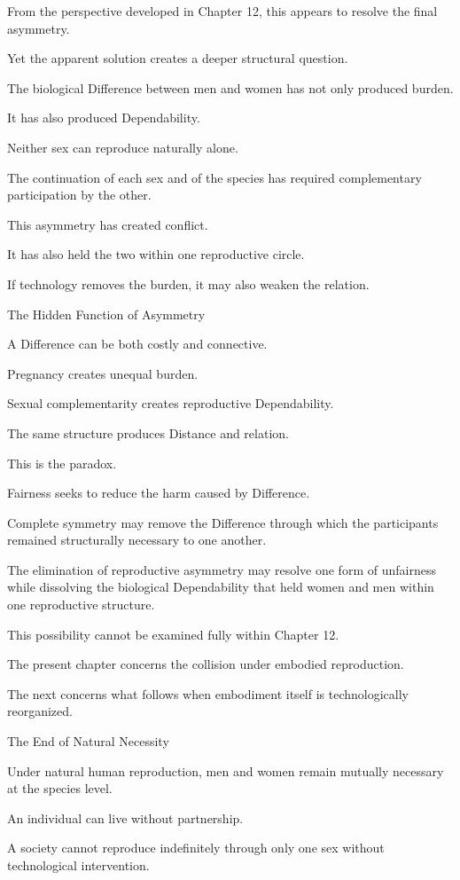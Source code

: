 From the perspective developed in Chapter 12, this appears to resolve the final asymmetry.

Yet the apparent solution creates a deeper structural question.

The biological Difference between men and women has not only produced burden.

It has also produced Dependability.

Neither sex can reproduce naturally alone.

The continuation of each sex and of the species has required complementary participation by the other.

This asymmetry has created conflict.

It has also held the two within one reproductive circle.

If technology removes the burden, it may also weaken the relation.

The Hidden Function of Asymmetry

A Difference can be both costly and connective.

Pregnancy creates unequal burden.

Sexual complementarity creates reproductive Dependability.

The same structure produces Distance and relation.

This is the paradox.

Fairness seeks to reduce the harm caused by Difference.

Complete symmetry may remove the Difference through which the participants remained structurally necessary to one another.

The elimination of reproductive asymmetry may resolve one form of unfairness while dissolving the biological Dependability that held women and men within one reproductive structure.

This possibility cannot be examined fully within Chapter 12.

The present chapter concerns the collision under embodied reproduction.

The next concerns what follows when embodiment itself is technologically reorganized.

The End of Natural Necessity

Under natural human reproduction, men and women remain mutually necessary at the species level.

An individual can live without partnership.

A society cannot reproduce indefinitely through only one sex without technological intervention.


